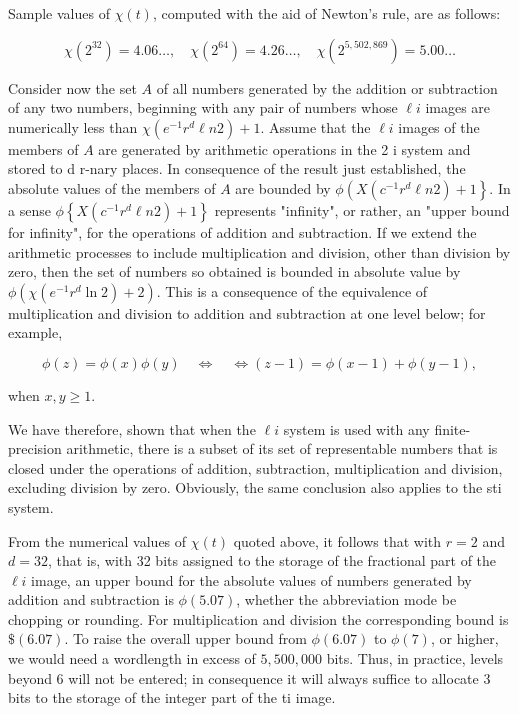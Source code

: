 \documentclass[10pt]{article}
\begin{document}
Sample values of $\chi(t)$, computed with the aid of Newton's rule, are as follows:

$$
\chi\left(2^{32}\right)=4.06 \ldots, \quad \chi\left(2^{64}\right)=4.26 \ldots, \quad \chi\left(2^{5,502,869}\right)=5.00 \ldots
$$

Consider now the set $A$ of all numbers generated by the addition or subtraction of any two numbers, beginning with any pair of numbers whose $\ell i$ images are numerically less than $\chi\left(e^{-1} r^{d} \ell n 2\right)+1$. Assume that the $\ell i$ images of the members of $A$ are generated by arithmetic operations in the 2 i system and stored to d r-nary places. In consequence of the result just established, the absolute values of the members of $A$ are bounded by $\phi\left(X\left(c^{-1} r^{d} \ell n 2\right)+1\right\}$. In a sense $\phi\left\{X\left(c^{-1} r^{d} \ell n 2\right)+1\right\}$ represents "infinity", or rather, an "upper bound for infinity", for the operations of addition and subtraction. If we extend the arithmetic processes to include multiplication and division, other than division by zero, then the set of numbers so obtained is bounded in absolute value by $\phi\left(\chi\left(e^{-1} r^{d} \ln 2\right)+2\right)$. This is a consequence of the equivalence of multiplication and division to addition and subtraction at one level below; for example,

$$
\phi(z)=\phi(x) \phi(y) \quad \Leftrightarrow \quad \Leftrightarrow(z-1)=\phi(x-1)+\phi(y-1),
$$

when $x, y \geqslant 1$.

We have therefore, shown that when the $\ell i$ system is used with any finite-precision arithmetic, there is a subset of its set of representable numbers that is closed under the operations of addition, subtraction, multiplication and division, excluding division by zero. Obviously, the same conclusion also applies to the sti system.

From the numerical values of $\chi(t)$ quoted above, it follows that with $r=2$ and $d=32$, that is, with 32 bits assigned to the storage of the fractional part of the $\ell i$ image, an upper bound for the absolute values of numbers generated by addition and subtraction is $\phi(5.07)$, whether the abbreviation mode be chopping or rounding. For multiplication and division the corresponding bound is $\$(6.07)$. To raise the overall upper bound from $\phi(6.07)$ to $\phi(7)$, or higher, we would need a wordlength in excess of $5,500,000$ bits. Thus, in practice, levels beyond 6 will not be entered; in consequence it will always suffice to allocate 3 bits to the storage of the integer part of the ti image.
\end{document}
